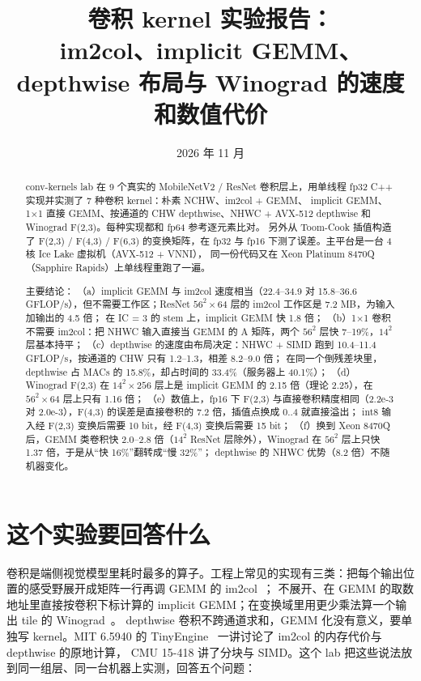 \documentclass[11pt,a4paper]{ctexart}
\title{卷积 kernel 实验报告：\\im2col、implicit GEMM、depthwise 布局与 Winograd 的速度和数值代价}
\author{\authorline}
\date{2026 年 11 月}
\begin{document}
\maketitle

\begin{abstract}
conv-kernels lab 在 9 个真实的 MobileNetV2 / ResNet 卷积层上，用单线程 fp32 C++ 实现并实测了 7 种卷积 kernel：朴素 NCHW、im2col + GEMM、
implicit GEMM、1×1 直接 GEMM、按通道的 CHW depthwise、NHWC + AVX-512 depthwise 和 Winograd F(2,3)。每种实现都和 fp64 参考逐元素比对。
另外从 Toom-Cook 插值构造了 F(2,3) / F(4,3) / F(6,3) 的变换矩阵，在 fp32 与 fp16 下测了误差。主平台是一台 4 核 Ice Lake 虚拟机（AVX-512 + VNNI），
同一份代码又在 Xeon Platinum 8470Q（Sapphire Rapids）上单线程重跑了一遍。

主要结论：
（a）implicit GEMM 与 im2col 速度相当（22.4--34.9 对 15.8--36.6 GFLOP/s），但不需要工作区；ResNet $56^2\times64$ 层的 im2col 工作区是 7.2 MB，为输入加输出的 4.5 倍；
在 IC = 3 的 stem 上，implicit GEMM 快 1.8 倍；
（b）1×1 卷积不需要 im2col：把 NHWC 输入直接当 GEMM 的 A 矩阵，两个 $56^2$ 层快 7--19\%，$14^2$ 层基本持平；
（c）depthwise 的速度由布局决定：NHWC + SIMD 跑到 10.4--11.4 GFLOP/s，按通道的 CHW 只有 1.2--1.3，相差 8.2--9.0 倍；
在同一个倒残差块里，depthwise 占 MACs 的 15.8\%，却占时间的 33.4\%（服务器上 40.1\%）；
（d）Winograd F(2,3) 在 $14^2\times256$ 层上是 implicit GEMM 的 2.15 倍（理论 2.25），在 $56^2\times64$ 层上只有 1.16 倍；
（e）数值上，fp16 下 F(2,3) 与直接卷积精度相同（2.2e-3 对 2.0e-3），F(4,3) 的误差是直接卷积的 7.2 倍，插值点换成 0..4 就直接溢出；
int8 输入经 F(2,3) 变换后需要 10 bit，经 F(4,3) 变换后需要 15 bit；
（f）换到 Xeon 8470Q 后，GEMM 类卷积快 2.0--2.8 倍（$14^2$ ResNet 层除外），Winograd 在 $56^2$ 层上只快 1.37 倍，于是从“快 16\%”翻转成“慢 32\%”；
depthwise 的 NHWC 优势（8.2 倍）不随机器变化。
\end{abstract}

\tableofcontents
\newpage

\section{这个实验要回答什么}\label{sec:questions}

卷积是端侧视觉模型里耗时最多的算子。工程上常见的实现有三类：把每个输出位置的感受野展开成矩阵一行再调 GEMM 的 im2col~\cite{chellapilla2006}；
不展开、在 GEMM 的取数地址里直接按卷积下标计算的 implicit GEMM；在变换域里用更少乘法算一个输出 tile 的 Winograd~\cite{lavin2016}。
depthwise 卷积不跨通道求和，GEMM 化没有意义，要单独写 kernel。MIT 6.5940 的 TinyEngine~\cite{mcunet} 一讲讨论了 im2col 的内存代价与 depthwise 的原地计算，
CMU 15-418 讲了分块与 SIMD。这个 lab 把这些说法放到同一组层、同一台机器上实测，回答五个问题：
\end{document}
